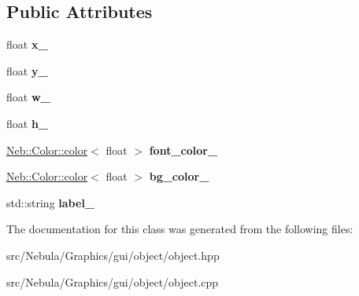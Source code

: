 \subsection*{\-Public \-Attributes}
\begin{DoxyCompactItemize}
\item 
\hypertarget{classNeb_1_1gui_1_1object_1_1Data_a7273b450412527b0ee04a2508dd05cce}{float {\bfseries x\-\_\-}}\label{classNeb_1_1gui_1_1object_1_1Data_a7273b450412527b0ee04a2508dd05cce}

\item 
\hypertarget{classNeb_1_1gui_1_1object_1_1Data_ada3026fdd107ddbe43a6de6430418901}{float {\bfseries y\-\_\-}}\label{classNeb_1_1gui_1_1object_1_1Data_ada3026fdd107ddbe43a6de6430418901}

\item 
\hypertarget{classNeb_1_1gui_1_1object_1_1Data_a174449b7b4c88c25d19efe06f022e4b7}{float {\bfseries w\-\_\-}}\label{classNeb_1_1gui_1_1object_1_1Data_a174449b7b4c88c25d19efe06f022e4b7}

\item 
\hypertarget{classNeb_1_1gui_1_1object_1_1Data_aba2bfb2f1819f911595e4e52ef2c761c}{float {\bfseries h\-\_\-}}\label{classNeb_1_1gui_1_1object_1_1Data_aba2bfb2f1819f911595e4e52ef2c761c}

\item 
\hypertarget{classNeb_1_1gui_1_1object_1_1Data_a03ed3fa05b542d10e31322ee627a40f4}{\hyperlink{classNeb_1_1Color_1_1color}{\-Neb\-::\-Color\-::color}$<$ float $>$ {\bfseries font\-\_\-color\-\_\-}}\label{classNeb_1_1gui_1_1object_1_1Data_a03ed3fa05b542d10e31322ee627a40f4}

\item 
\hypertarget{classNeb_1_1gui_1_1object_1_1Data_a097b47c78cc539d75e1a895a2a385748}{\hyperlink{classNeb_1_1Color_1_1color}{\-Neb\-::\-Color\-::color}$<$ float $>$ {\bfseries bg\-\_\-color\-\_\-}}\label{classNeb_1_1gui_1_1object_1_1Data_a097b47c78cc539d75e1a895a2a385748}

\item 
\hypertarget{classNeb_1_1gui_1_1object_1_1Data_a36135fece215ee3a34ca8f11e67b5b72}{std\-::string {\bfseries label\-\_\-}}\label{classNeb_1_1gui_1_1object_1_1Data_a36135fece215ee3a34ca8f11e67b5b72}

\end{DoxyCompactItemize}


\-The documentation for this class was generated from the following files\-:\begin{DoxyCompactItemize}
\item 
src/\-Nebula/\-Graphics/gui/object/object.\-hpp\item 
src/\-Nebula/\-Graphics/gui/object/object.\-cpp\end{DoxyCompactItemize}

